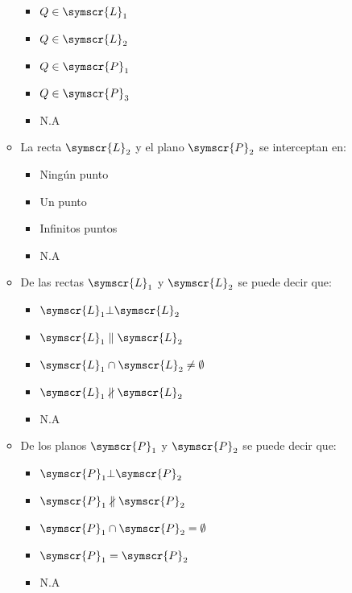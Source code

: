 \documentclass{article}
\def\fancyL{\symscr{L}}
\def\fancyP{\symscr{P}}
\begin{document}
\begin{enumerate}
\begin{itemize}
            \begin{itemize}
                \item \(Q \in \fancyL_1\)
                \item \(Q \in \fancyL_2\)
                \item \(Q \in \fancyP_1\)
                \item \(Q \in \fancyP_3\)
                \item N.A
            \end{itemize}
        \item La recta \(\fancyL_2\) y el plano \(\fancyP_2\) se interceptan en:
            \begin{itemize}
				\item Ningún punto
				\item Un punto
				\item Infinitos puntos
				\item N.A
            \end{itemize}
        \item De las rectas \(\fancyL_1\) y \(\fancyL_2\) se puede decir que:
            \begin{itemize}
                \item \(\fancyL_1 \bot \fancyL_2\)
                \item \(\fancyL_1 \parallel \fancyL_2\)
                \item \(\fancyL_1 \cap \fancyL_2 \neq \emptyset\)
                \item \(\fancyL_1 \nparallel \fancyL_2\)
                \item N.A
            \end{itemize}
        \item De los planos \(\fancyP_1\) y \(\fancyP_2\) se puede decir que:
            \begin{itemize}
                \item \(\fancyP_1 \bot \fancyP_2\)
                \item \(\fancyP_1 \nparallel \fancyP_2\)
                \item \(\fancyP_1 \cap \fancyP_2 = \emptyset\)
                \item \(\fancyP_1 = \fancyP_2\)
                \item N.A
            \end{itemize}
    \end{itemize}
\end{enumerate}
\end{document}
